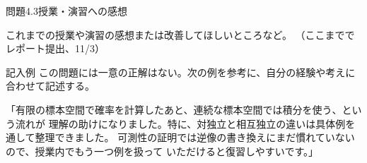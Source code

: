 \documentclass[a4paper,10pt,pdflatex,ja=standard,jafont=ipaex-type1,
  magstyle=real,scale=1]{bxjsarticle}
\newcommand{\topic}[1]{\par\vspace{5pt}
  {\large\sffamily\mdseries\color{accent}#1}\par\vspace{2pt}}
\newcommand{\keybox}[1]{\par\vspace{3pt}\begingroup
  \setlength{\fboxsep}{5pt}
  \colorbox{soft}{\parbox{\dimexpr\linewidth-2\fboxsep\relax}{#1}}%
  \endgroup\par\vspace{2pt}}
\newcommand{\examplelabel}[1]{{\sffamily\mdseries\color{ink}#1}}
\begin{document}
\topic{問題4.3\quad 授業・演習への感想}
\keybox{これまでの授業や演習の感想または改善してほしいところなど。
（ここまででレポート提出、11/3）}

\examplelabel{記入例}
この問題には一意の正解はない。次の例を参考に、自分の経験や考えに合わせて記述する。

「有限の標本空間で確率を計算したあと、連続な標本空間では積分を使う、という流れが
理解の助けになりました。特に、対独立と相互独立の違いは具体例を通して整理できました。
可測性の証明では逆像の書き換えにまだ慣れていないので、授業内でもう一つ例を扱って
いただけると復習しやすいです。」

\label{lastpage}
\end{document}
